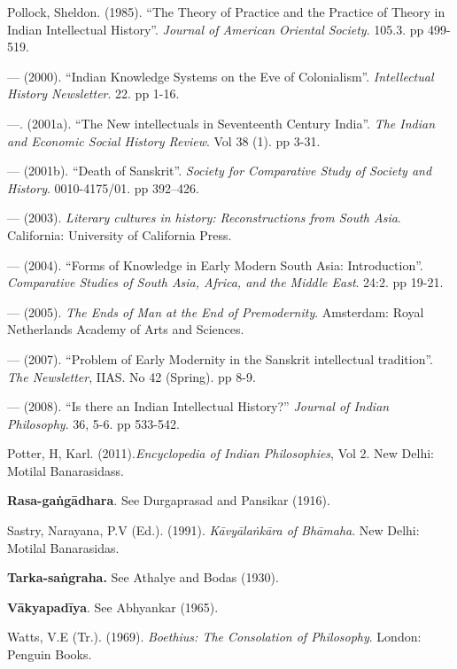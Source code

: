 \begin{thebibliography}{99}
 Pollock, Sheldon. (1985). “The Theory of Practice and the Practice of Theory in Indian Intellectual History”. {\sl Journal of American Oriental Society}. 105.3. pp 499-519. 

 --- (2000). “Indian Knowledge Systems on the Eve of Colonialism”. {\sl Intellectual History Newsletter}. 22. pp 1-16.

 ---. (2001a). “The New intellectuals in Seventeenth Century India”. {\sl The Indian and Economic Social History Review}. Vol 38 (1). pp 3-31.

 --- (2001b). “Death of Sanskrit”. {\sl Society for Comparative Study of Society and History}. 0010-4175/01. pp 392–426. 

 --- (2003). {\sl Literary cultures in history: Reconstructions from South Asia}. California: University of California Press. 

 --- (2004). “Forms of Knowledge in Early Modern South Asia: Introduction”. {\sl Comparative Studies of South Asia, Africa, and the Middle East}. 24:2. pp 19-21.

 --- (2005). {\sl The Ends of Man at the End of Premodernity}. Amsterdam: Royal Netherlands Academy of Arts and Sciences. 

 --- (2007). “Problem of Early Modernity in the Sanskrit intellectual tradition”. {\sl The Newsletter}, IIAS. No 42 (Spring). pp 8-9. 

 --- (2008). “Is there an Indian Intellectual History?” {\sl Journal of Indian Philosophy}. 36, 5-6. pp 533-542.

 Potter, H, Karl. (2011).{\sl  Encyclopedia of Indian Philosophies}, Vol 2. New Delhi: Motilal Banarasidass. 

{\bf Rasa-gaṅgādhara}. See Durgaprasad and Pansikar (1916).

 Sastry, Narayana, P.V (Ed.). (1991). {\sl Kāvyālaṅkāra of Bhāmaha}. New Delhi: Motilal Banarasidas. 

 {\bf Tarka-saṅgraha.} See Athalye and Bodas (1930).

{\bf Vākyapadīya}. See Abhyankar (1965).

 Watts, V.E (Tr.). (1969). {\sl Boethius: The Consolation of Philosophy}. London: Penguin Books. 
\end{thebibliography}

\theendnotes
\label{chapter\thechapter:end}
